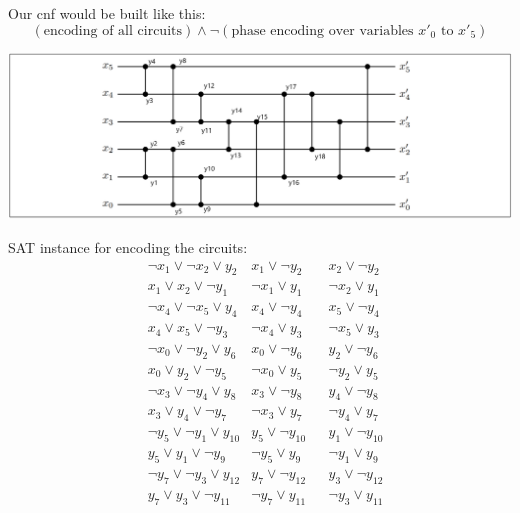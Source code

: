\documentclass{base}
\begin{document}
Our cnf would be built like this:
$$(\text{encoding of all circuits}) \land \neg (\text{phase encoding over variables } x'_0\text{ to } x'_5)$$
\begin{center}
	\includegraphics[width=\linewidth]{sorting_network.png}
\end{center}
SAT instance for encoding the circuits:
\begin{align*}
	&\neg x_{1}\lor \neg x_{2}\lor y_{2} & x_{1}\lor \neg y_{2} && x_{2}\lor \neg y_{2}\\
	&x_{1}\lor x_{2}\lor \neg y_{1} & \neg x_{1} \lor y_{1} && \neg x_{2} \lor y_{1}\\
	&\neg x_{4}\lor \neg x_{5}\lor y_{4} & x_{4}\lor \neg y_{4} && x_{5}\lor \neg y_{4}\\
	&x_{4}\lor x_{5}\lor \neg y_{3} & \neg x_{4} \lor y_{3} && \neg x_{5} \lor y_{3}\\
	&\neg x_{0}\lor \neg y_{2}\lor y_{6} & x_{0}\lor \neg y_{6} && y_{2}\lor \neg y_{6}\\
	&x_{0}\lor y_{2}\lor \neg y_{5} & \neg x_{0} \lor y_{5} && \neg y_{2} \lor y_{5}\\
	&\neg x_{3}\lor \neg y_{4}\lor y_{8} & x_{3}\lor \neg y_{8} && y_{4}\lor \neg y_{8}\\
	&x_{3}\lor y_{4}\lor \neg y_{7} & \neg x_{3} \lor y_{7} && \neg y_{4} \lor y_{7}\\
	&\neg y_{5}\lor \neg y_{1}\lor y_{10} & y_{5}\lor \neg y_{10} && y_{1}\lor \neg y_{10}\\
	&y_{5}\lor y_{1}\lor \neg y_{9} & \neg y_{5} \lor y_{9} && \neg y_{1} \lor y_{9}\\
	&\neg y_{7}\lor \neg y_{3}\lor y_{12} & y_{7}\lor \neg y_{12} && y_{3}\lor \neg y_{12}\\
	&y_{7}\lor y_{3}\lor \neg y_{11} & \neg y_{7} \lor y_{11} && \neg y_{3} \lor y_{11}\\

\end{align*}
\end{document}
